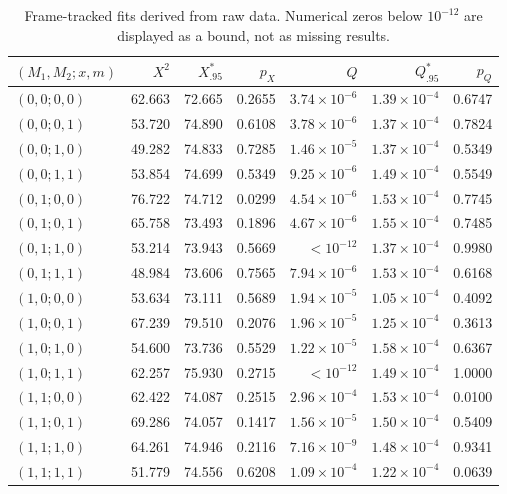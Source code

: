 \documentclass[10pt,a4paper]{article}
\begin{document}
\par\begin{table}[htbp]\centering\footnotesize
\caption{Frame-tracked fits derived from raw data. Numerical zeros below $10^{-12}$ are displayed as a bound, not as missing results.}\label{stab:gof_frame_tracked}
\begin{tabular}{lrrrrrr}\toprule
$(M_1,M_2;x,m)$ & $X^2$ & $X^*_{.95}$ & $p_X$ & $Q$ & $Q^*_{.95}$ & $p_Q$\\\midrule
$(0,0;0,0)$ & 62.663 & 72.665 & 0.2655 & $3.74\times10^{-6}$ & $1.39\times10^{-4}$ & 0.6747 \\
$(0,0;0,1)$ & 53.720 & 74.890 & 0.6108 & $3.78\times10^{-6}$ & $1.37\times10^{-4}$ & 0.7824 \\
$(0,0;1,0)$ & 49.282 & 74.833 & 0.7285 & $1.46\times10^{-5}$ & $1.37\times10^{-4}$ & 0.5349 \\
$(0,0;1,1)$ & 53.854 & 74.699 & 0.5349 & $9.25\times10^{-6}$ & $1.49\times10^{-4}$ & 0.5549 \\
$(0,1;0,0)$ & 76.722 & 74.712 & 0.0299 & $4.54\times10^{-6}$ & $1.53\times10^{-4}$ & 0.7745 \\
$(0,1;0,1)$ & 65.758 & 73.493 & 0.1896 & $4.67\times10^{-6}$ & $1.55\times10^{-4}$ & 0.7485 \\
$(0,1;1,0)$ & 53.214 & 73.943 & 0.5669 & $<10^{-12}$ & $1.37\times10^{-4}$ & 0.9980 \\
$(0,1;1,1)$ & 48.984 & 73.606 & 0.7565 & $7.94\times10^{-6}$ & $1.53\times10^{-4}$ & 0.6168 \\
$(1,0;0,0)$ & 53.634 & 73.111 & 0.5689 & $1.94\times10^{-5}$ & $1.05\times10^{-4}$ & 0.4092 \\
$(1,0;0,1)$ & 67.239 & 79.510 & 0.2076 & $1.96\times10^{-5}$ & $1.25\times10^{-4}$ & 0.3613 \\
$(1,0;1,0)$ & 54.600 & 73.736 & 0.5529 & $1.22\times10^{-5}$ & $1.58\times10^{-4}$ & 0.6367 \\
$(1,0;1,1)$ & 62.257 & 75.930 & 0.2715 & $<10^{-12}$ & $1.49\times10^{-4}$ & 1.0000 \\
$(1,1;0,0)$ & 62.422 & 74.087 & 0.2515 & $2.96\times10^{-4}$ & $1.53\times10^{-4}$ & 0.0100 \\
$(1,1;0,1)$ & 69.286 & 74.057 & 0.1417 & $1.56\times10^{-5}$ & $1.50\times10^{-4}$ & 0.5409 \\
$(1,1;1,0)$ & 64.261 & 74.946 & 0.2116 & $7.16\times10^{-9}$ & $1.48\times10^{-4}$ & 0.9341 \\
$(1,1;1,1)$ & 51.779 & 74.556 & 0.6208 & $1.09\times10^{-4}$ & $1.22\times10^{-4}$ & 0.0639 \\
\bottomrule\end{tabular}\end{table}\par
\end{document}
